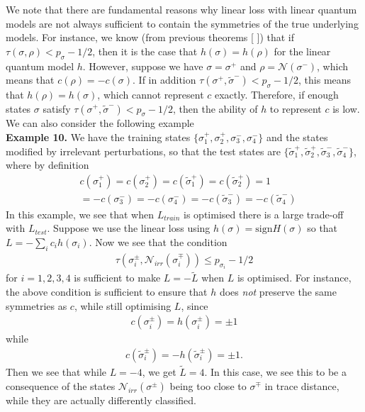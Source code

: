 \documentclass[onecolumn,prx, superscriptaddress,longbibliography,margin=1mm 11pt]{revtex4-2}
\begin{document}
We note that there are fundamental reasons why linear loss with linear quantum models are not always sufficient to contain the symmetries of the true underlying models. For instance, we know (from previous theorems [ ]) that if $\tau(\sigma, \rho)<p_{\sigma}-1/2$, then it is the case that $h(\sigma)=h(\rho)$ for the linear quantum model $h$. However, suppose we have $\sigma=\sigma^+$ and $\rho=\mathcal{N}(\sigma^-)$, which means that $c(\rho)=-c(\sigma)$. If in addition $\tau(\sigma^+, \tilde{\sigma}^-)<p_{\sigma}-1/2$, this means that $h(\rho)=h(\sigma)$, which cannot represent $c$ exactly. Therefore, if enough states $\sigma$ satisfy $\tau(\sigma^+, \tilde{\sigma}^-)<p_{\sigma}-1/2$, then the ability of $h$ to represent $c$ is low. We can also consider the following example \\

\noindent \textbf{Example 10.}
    We have the training states $\{\sigma^+_1, \sigma^+_2, \sigma^-_3, \sigma^-_4\}$ and the states modified by irrelevant perturbations, so that the test states are $\{\tilde{\sigma}^+_1, \tilde{\sigma}^+_2, \tilde{\sigma}^-_3, \tilde{\sigma}^-_4\}$, where by definition 
\begin{align}
    &c(\sigma^+_1)=c(\sigma^+_2)=c(\tilde{\sigma}^+_1)=c(\tilde{\sigma}^+_2)=1 \nonumber \\
    &=-c(\sigma^-_3)=-c(\sigma^-_4)=-c(\tilde{\sigma}^-_3)=-c(\tilde{\sigma}^-_4)
\end{align}
In this example, we see that when $L_{train}$ is optimised there is a large trade-off with $L_{test}$. Suppose we use the linear loss using $h(\sigma)=\text{sign}H(\sigma)$ so that $L=-\sum_i c_i h(\sigma_i)$. Now we see that the condition 
\begin{align}
    \tau(\sigma_i^{\pm}, \mathcal{N}_{irr}({\sigma}^{\mp}_i))\leq p_{\sigma_i}-1/2
\end{align}
for $i=1,2,3,4$ is sufficient to make $L=-\tilde{L}$ when $L$ is optimised. For instance, the above condition is sufficient to ensure that $h$ does \textit{not} preserve the same symmetries as $c$, while still optimising $L$, since
\begin{align}
    c(\sigma^{\pm}_i)=h(\sigma^{\pm}_i)=\pm 1
\end{align}
while 
\begin{align}
    c(\tilde{\sigma}^{\pm}_i)=-h(\tilde{\sigma}^{\pm}_i)=\pm 1.
\end{align}
Then we see that while $L=-4$, we get $\tilde{L}=4$. In this case, we see this to be a consequence of the states $\mathcal{N}_{irr}(\sigma^{\pm})$ being too close to $\sigma^{\mp}$ in trace distance, while they are actually differently classified. \\
\end{document}
